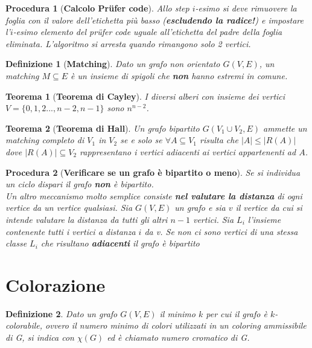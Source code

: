 \documentclass[10pt,a4paper,titlepage]{article}
\theoremstyle{break}
\newtheorem{myDef}{Definizione}
\theoremstyle{break}
\newtheorem{myProced}{Procedura}
\theoremstyle{break}
\newtheorem{myThm}{Teorema}
\begin{document}
\begin{myProced}[\textbf{Calcolo Pr{\"u}fer code}]
Allo step $i$-esimo si deve rimuovere la foglia con il valore dell'etichetta più basso (\textbf{escludendo la radice!}) e impostare l'$i$-esimo elemento del pr{\"u}fer code uguale all'etichetta del \textit{padre} della foglia eliminata. L'algoritmo si arresta quando rimangono solo 2 vertici.
\end{myProced}

\begin{myDef}[\textbf{Matching}]
Dato un grafo non orientato $G(V, E)$, un matching $M \subseteq E$ è un insieme di spigoli che \textbf{non} hanno estremi in comune.
\end{myDef}

\begin{myThm}[\textbf{Teorema di Cayley}]
I diversi alberi con insieme dei vertici $V=\lbrace0,1,2...,n-2,n-1\rbrace$ sono $n^{n-2}$.
\end{myThm}

\begin{myThm}[\textbf{Teorema di Hall}]
Un grafo bipartito $G(V_1 \cup V_2, E)$ ammette un matching completo di $V_1$ in $V_2$ se e solo se $\forall A \subseteq V_1$ risulta che $|A| \leq |R(A)|$ dove $|R(A)| \subseteq V_2$ rappresentano i vertici adiacenti ai vertici appartenenti ad $A$.
\end{myThm}

\begin{myProced}[\textbf{Verificare se un grafo è bipartito o meno}]
Se si individua un \textit{ciclo dispari} il grafo \textbf{non} è bipartito.\\
Un altro meccanismo molto semplice consiste \textbf{nel valutare la distanza} di ogni vertice da un vertice qualsiasi. Sia $G(V,E)$ un grafo e sia $v$ il vertice da cui si intende valutare la distanza da tutti gli altri $n-1$ vertici. Sia $L_i$ l'insieme contenente tutti i vertici a distanza $i$ da v. \textit{Se non ci sono vertici di una stessa classe $L_i$
che risultano \textbf{adiacenti} il grafo è bipartito}
\end{myProced}



\newpage
\section{Colorazione}
\begin{myDef}
Dato un grafo $G(V, E)$ il minimo $k$ per cui il grafo è $k$-colorabile, ovvero il numero minimo di colori utilizzati in un coloring ammissibile di G, si indica con $\chi(G)$ ed è chiamato numero cromatico di G.
\end{myDef}
\end{document}

